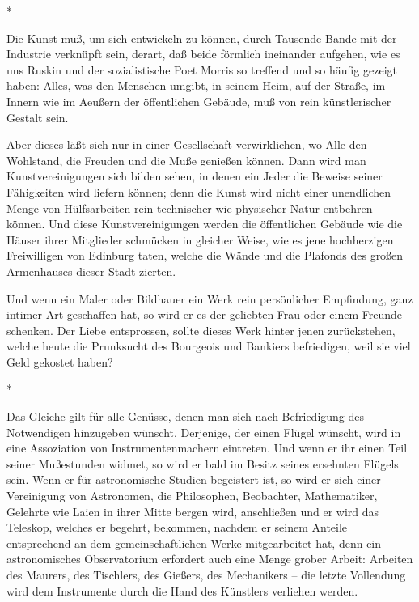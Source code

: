 \documentclass{scrbook}
\begin{document}
\begin{center}*\end{center}

Die Kunst muß, um sich entwickeln zu können, durch Tausende Bande mit der Industrie verknüpft sein, derart, daß beide förmlich ineinander aufgehen, wie es uns Ruskin und der sozialistische Poet Morris so treffend und so häufig gezeigt haben: Alles, was den Menschen umgibt, in seinem Heim, auf der Straße, im Innern wie im Aeußern der öffentlichen Gebäude, muß von rein künstlerischer Gestalt sein.

Aber dieses läßt sich nur in einer Gesellschaft verwirklichen, wo Alle den Wohlstand, die Freuden und die Muße genießen können. Dann wird man Kunstvereinigungen sich bilden sehen, in denen ein Jeder die Beweise seiner Fähigkeiten wird liefern können; denn die Kunst wird nicht einer unendlichen Menge von Hülfsarbeiten rein technischer wie physischer Natur entbehren können. Und diese Kunstvereinigungen werden die öffentlichen Gebäude wie die Häuser ihrer Mitglieder schmücken in gleicher Weise, wie es jene hochherzigen Freiwilligen von Edinburg taten, welche die Wände und die Plafonds des großen Armenhauses dieser Stadt zierten.

Und wenn ein Maler oder Bildhauer ein Werk rein persönlicher Empfindung, ganz intimer Art geschaffen hat, so wird er es der geliebten Frau oder einem Freunde schenken. Der Liebe entsprossen, sollte dieses Werk hinter jenen zurückstehen, welche heute die Prunksucht des Bourgeois und Bankiers befriedigen, weil sie viel Geld gekostet haben?

\begin{center}*\end{center}

Das Gleiche gilt für alle Genüsse, denen man sich nach Befriedigung des Notwendigen hinzugeben wünscht. Derjenige, der einen Flügel wünscht, wird in eine Assoziation von Instrumentenmachern eintreten. Und wenn er ihr einen Teil seiner Mußestunden widmet, so wird er bald im Besitz seines ersehnten Flügels sein. Wenn er für astronomische Studien begeistert ist, so wird er sich einer Vereinigung von Astronomen, die Philosophen, Beobachter, Mathematiker, Gelehrte wie Laien in ihrer Mitte bergen wird, anschließen und er wird das Teleskop, welches er begehrt, bekommen, nachdem er seinem Anteile entsprechend an dem gemeinschaftlichen Werke mitgearbeitet hat, denn ein astronomisches Observatorium erfordert auch eine Menge grober Arbeit: Arbeiten des Maurers, des Tischlers, des Gießers, des Mechanikers – die letzte Vollendung wird dem Instrumente durch die Hand des Künstlers verliehen werden.
\end{document}
